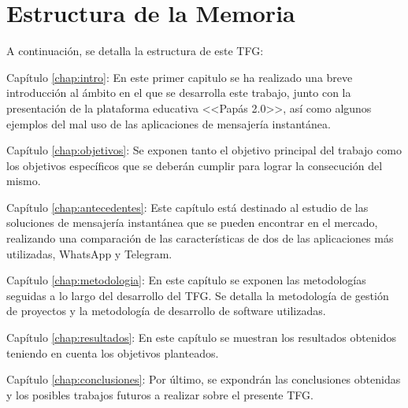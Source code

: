 \section{Estructura de la Memoria}
A continuación, se detalla la estructura de este \acs{TFG}:

\begin{definitionlist}	
	\item[Capítulo \ref{chap:intro}: \nameref{chap:intro}]
	En este primer capitulo se ha realizado una breve introducción al ámbito en el que se desarrolla este trabajo, junto con la presentación de la plataforma educativa <<Papás 2.0>>, así como algunos ejemplos del mal uso de las aplicaciones de mensajería instantánea.
	
	\item[Capítulo \ref{chap:objetivos}: \nameref{chap:objetivos}]
	Se exponen tanto el objetivo principal del trabajo como los objetivos específicos que se deberán cumplir para lograr la consecución del mismo.
	
	\item[Capítulo \ref{chap:antecedentes}: \nameref{chap:antecedentes}]
	Este capítulo está destinado al estudio de las soluciones de mensajería instantánea que se pueden encontrar en el mercado, realizando una comparación de las características de dos de las aplicaciones más utilizadas, WhatsApp y Telegram.
	
	\item[Capítulo \ref{chap:metodologia}: \nameref{chap:metodologia}]
	En este capítulo se exponen las metodologías seguidas a lo largo del desarrollo del \acs{TFG}. Se detalla la metodología de gestión de proyectos y la metodología de desarrollo de software utilizadas.
	
	\item[Capítulo \ref{chap:resultados}: \nameref{chap:resultados}]
	En este capítulo se muestran los resultados obtenidos teniendo en cuenta los objetivos planteados.
	
	\item[Capítulo \ref{chap:conclusiones}: \nameref{chap:conclusiones}]
	Por último, se expondrán las conclusiones obtenidas y los posibles trabajos futuros a realizar sobre el presente \acs{TFG}.
\end{definitionlist}

